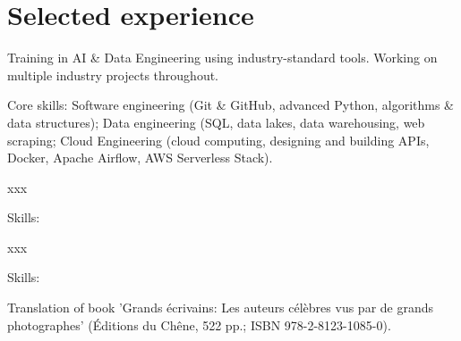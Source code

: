 \documentclass[]{plushcv}
\begin{document}
\begin{minipage}[t]{0.70\textwidth} 



\section{Selected experience}

Training in AI \& Data Engineering using industry-standard tools. Working on multiple industry projects throughout.
\sectionsep
\sectionsep
\begin{tightemize}
\item Core skills: Software engineering (Git \& GitHub, advanced Python, algorithms \& data structures); Data engineering (SQL, data lakes, data warehousing, web scraping;
Cloud Engineering (cloud computing, designing and building APIs, Docker, Apache Airflow, AWS Serverless Stack).
\end{tightemize}
\sectionsep

xxx
\begin{tightemize}
\sectionsep
\item Skills:
\end{tightemize}
\sectionsep

xxx
\begin{tightemize}
\sectionsep
\item Skills:
\end{tightemize}
\sectionsep

Translation of book 'Grands écrivains: Les auteurs célèbres vus par de grands photographes' (Éditions du Chêne, 522 pp.; ISBN 978-2-8123-1085-0).
\sectionsep




\end{minipage}
\end{document}
